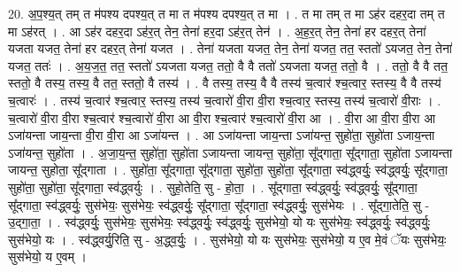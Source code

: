 \documentclass[17pt]{extarticle}
\begin{document}
20. अ॒प॒श्य॒त् तम् त म॑पश्य दपश्य॒त् त मा त म॑पश्य दपश्य॒त् त मा । . त मा तम् त मा ऽह॑र दहर॒दा तम् त मा ऽह॑रत् । . आ ऽह॑र दहर॒दा ऽह॑र॒त् तेन॒ तेना॑ हर॒दा ऽह॑र॒त् तेन॑ । . अ॒ह॒र॒त् तेन॒ तेना॑ हर दहर॒त् तेना॑ यजता यजत॒ तेना॑ हर दहर॒त् तेना॑ यजत । . तेना॑ यजता यजत॒ तेन॒ तेना॑ यजत॒ तत॒ स्ततो॑ ऽयजत॒ तेन॒ तेना॑ यजत॒ ततः॑ । . अ॒य॒ज॒त॒ तत॒ स्ततो॑ ऽयजता यजत॒ ततो॒ वै वै ततो॑ ऽयजता यजत॒ ततो॒ वै । . ततो॒ वै वै तत॒ स्ततो॒ वै तस्य॒ तस्य॒ वै तत॒ स्ततो॒ वै तस्य॑ । . वै तस्य॒ तस्य॒ वै वै तस्य॑ च॒त्वार॑ श्च॒त्वार॒ स्तस्य॒ वै वै तस्य॑ च॒त्वारः॑ । . तस्य॑ च॒त्वार॑ श्च॒त्वार॒ स्तस्य॒ तस्य॑ च॒त्वारो॑ वी॒रा वी॒रा श्च॒त्वार॒ स्तस्य॒ तस्य॑ च॒त्वारो॑ वी॒राः । . च॒त्वारो॑ वी॒रा वी॒रा श्च॒त्वार॑ श्च॒त्वारो॑ वी॒रा आ वी॒रा श्च॒त्वार॑ श्च॒त्वारो॑ वी॒रा आ । . वी॒रा आ वी॒रा वी॒रा आ ऽजा॑यन्ता जाय॒न्ता वी॒रा वी॒रा आ ऽजा॑यन्त । . आ ऽजा॑यन्ता जाय॒न्ता ऽजा॑यन्त॒ सुहो॑ता॒ सुहो॑ता ऽजाय॒न्ता ऽजा॑यन्त॒ सुहो॑ता । . अ॒जा॒य॒न्त॒ सुहो॑ता॒ सुहो॑ता ऽजायन्ता जायन्त॒ सुहो॑ता॒ सू᳚द्‍गाता॒ सू᳚द्‍गाता॒ सुहो॑ता ऽजायन्ता जायन्त॒ सुहोता॒ 
सू᳚द्‍गाता । . सुहो॑ता॒ सू᳚द्‍गाता॒ सू᳚द्‍गाता॒ सुहो॑ता॒ सुहो॑ता॒ सू᳚द्‍गाता॒ स्व॑द्ध्वर्युः॒ स्व॑द्ध्वर्युः॒ सू᳚द्‍गाता॒ सुहो॑ता॒ सुहो॑ता॒ सू᳚द्‍गाता॒ स्व॑द्ध्वर्युः । . सुहो॒तेति॒ सु - हो॒ता॒ । . सू᳚द्‍गाता॒ स्व॑द्ध्वर्युः॒ स्व॑द्ध्वर्युः॒ सू᳚द्‍गाता॒ सू᳚द्‍गाता॒ स्व॑द्ध्वर्युः॒ सुस॑भेयः॒ सुस॑भेयः॒ स्व॑द्ध्वर्युः॒ सू᳚द्‍गाता॒ सू᳚द्‍गाता॒ स्व॑द्ध्वर्युः॒ सुस॑भेयः । . सू᳚द्‍गा॒तेति॒ सु - उ॒द्‍गा॒ता॒ । . स्व॑द्ध्वर्युः॒ सुस॑भेयः॒ सुस॑भेयः॒ स्व॑द्ध्वर्युः॒ स्व॑द्ध्वर्युः॒ सुस॑भेयो॒ यो यः सुस॑भेयः॒ स्व॑द्ध्वर्युः॒ स्व॑द्ध्वर्युः॒ सुस॑भेयो॒ यः । . स्व॑द्ध्वर्यु॒रिति॒ सु - अ॒द्ध्व॒र्युः॒ । . सुस॑भेयो॒ यो यः सुस॑भेयः॒ सुस॑भेयो॒ य ए॒व मे॒वं ॅयः सुस॑भेयः॒ सुस॑भेयो॒ य ए॒वम् । \newline
\end{document}
